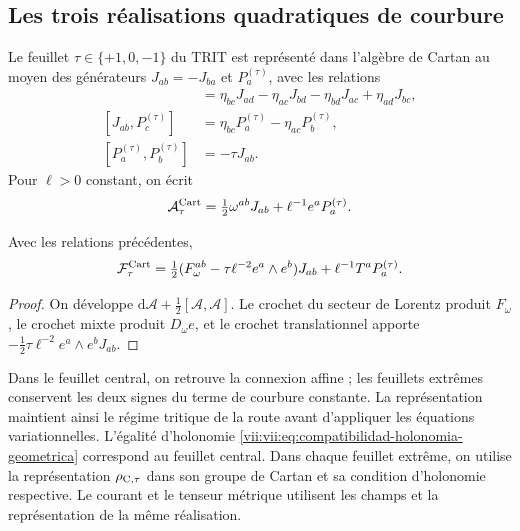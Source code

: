 \subsection{Les trois réalisations quadratiques de courbure}

Le feuillet \(\tau\in\{+1,0,-1\}\) du TRIT est représenté dans
l'algèbre de Cartan au moyen des générateurs \(J_{ab}=-J_{ba}\)
et \(P_a^{(\tau)}\), avec les relations
\begin{align*}
 [J_{ab},J_{cd}]&=
 \eta_{bc}J_{ad}-\eta_{ac}J_{bd}
 -\eta_{bd}J_{ac}+\eta_{ad}J_{bc},\\
 [J_{ab},P_c^{(\tau)}]&=
 \eta_{bc}P_a^{(\tau)}-\eta_{ac}P_b^{(\tau)},\\
 [P_a^{(\tau)},P_b^{(\tau)}]&=-\tau J_{ab}.
\end{align*}
Pour \(\ell>0\) constant, on écrit
\[
 \mathcal A_\tau^{\rm Cart}
 =\tfrac12\omega^{ab}J_{ab}+\ell^{-1}e^aP_a^{(\tau)}.
\]

\begin{proposition}
\label{vii:vii:prop:curvatura-tritificada}
Avec les relations précédentes,
\begin{equation}
 \mathcal F_\tau^{\rm Cart}
 =\tfrac12(F_\omega^{ab}-\tau\ell^{-2}e^a\wedge e^b)J_{ab}
     +\ell^{-1}T^aP_a^{(\tau)}.
 \label{vii:vii:eq:curvatura-tritificada}
\end{equation}
\end{proposition}
\begin{proof}
On développe \(\mathrm d\mathcal A+\tfrac12[\mathcal A,\mathcal A]\). Le crochet du secteur de Lorentz produit \(F_\omega\), le crochet mixte produit \(D_\omega e\), et le crochet translationnel apporte \(-\tfrac12\tau\ell^{-2}e^a\wedge e^bJ_{ab}\).
\end{proof}

Dans le feuillet central, on retrouve la connexion affine ; les feuillets extrêmes
conservent les deux signes du terme de courbure constante. La
représentation maintient ainsi le régime tritique de la route avant
d'appliquer les équations variationnelles. L'égalité d'holonomie
\eqref{vii:vii:eq:compatibilidad-holonomia-geometrica} correspond au
feuillet central. Dans chaque feuillet extrême, on utilise la représentation
\(\rho_{{\rm C},\tau}\) dans son groupe de Cartan et sa condition
d'holonomie respective. Le courant et le tenseur métrique utilisent
les champs et la représentation de la même réalisation.
